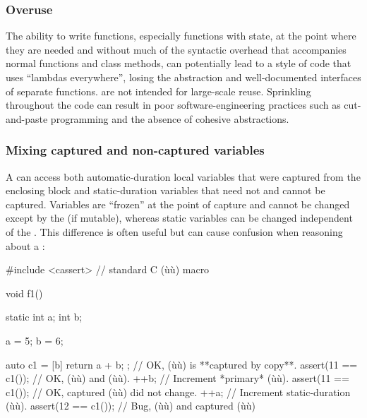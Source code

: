 \subsubsection[Overuse]{Overuse}\label{overuse}

The ability to write functions, especially functions with state, at the
point where they are needed and without much of the syntactic overhead
that accompanies normal functions and class methods, can potentially
lead to a style of code that uses ``lambdas everywhere'', losing the
abstraction and well-documented interfaces of separate functions.
 are not intended for large-scale reuse.
Sprinkling  throughout the code can result in
poor software-engineering practices such as cut-and-paste programming
and the absence of cohesive abstractions.

\subsubsection[Mixing captured and non-captured variables]{Mixing captured and non-captured variables}\label{mixing-captured-and-non-captured-variables}

A  can access both automatic-duration local
variables that were captured from the enclosing block and
static-duration variables that need not and cannot be captured.
Variables  are ``frozen'' at the point of
capture and cannot be changed except by the  (if
mutable), whereas static variables can be changed independent of the
. This difference is often useful but can
cause confusion when reasoning about a :

\begin{emcppshiddenlisting}[emcppsbatch=e14]
#include <cassert>  // standard C (ù{}ù) macro
\end{emcppshiddenlisting}
\begin{emcppslisting}[emcppsbatch=e14]

void f1()
{
    static int a;
    int        b;

    a = 5;
    b = 6;

    auto c1 = [b]{ return a + b; };  // OK, (ù{}ù) is **captured by copy**.
    assert(11 == c1());              // OK, (ù{}ù) and (ù{}ù).
    ++b;                             // Increment *primary* (ù{}ù).
    assert(11 == c1());              // OK, captured (ù{}ù) did not change.
    ++a;                             // Increment static-duration (ù{}ù).
    assert(12 == c1());              // Bug, (ù{}ù) and captured (ù{}ù)
}
\end{emcppslisting}
    

